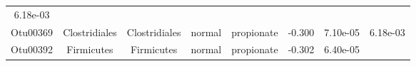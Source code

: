 \documentclass[11pt,]{article}
\begin{document}
\begin{longtable}[]{@{}cccccccc@{}}
\begin{minipage}[t]{0.08\columnwidth}
6.18e-03\strut
\end{minipage}\tabularnewline
\begin{minipage}[t]{0.08\columnwidth}\centering\strut
Otu00369\strut
\end{minipage} & \begin{minipage}[t]{0.15\columnwidth}\centering\strut
Clostridiales\strut
\end{minipage} & \begin{minipage}[t]{0.15\columnwidth}\centering\strut
Clostridiales\strut
\end{minipage} & \begin{minipage}[t]{0.08\columnwidth}\centering\strut
normal\strut
\end{minipage} & \begin{minipage}[t]{0.09\columnwidth}\centering\strut
propionate\strut
\end{minipage} & \begin{minipage}[t]{0.07\columnwidth}\centering\strut
-0.300\strut
\end{minipage} & \begin{minipage}[t]{0.08\columnwidth}\centering\strut
7.10e-05\strut
\end{minipage} & \begin{minipage}[t]{0.08\columnwidth}\centering\strut
6.18e-03\strut
\end{minipage}\tabularnewline
\begin{minipage}[t]{0.08\columnwidth}\centering\strut
Otu00392\strut
\end{minipage} & \begin{minipage}[t]{0.15\columnwidth}\centering\strut
Firmicutes\strut
\end{minipage} & \begin{minipage}[t]{0.15\columnwidth}\centering\strut
Firmicutes\strut
\end{minipage} & \begin{minipage}[t]{0.08\columnwidth}\centering\strut
normal\strut
\end{minipage} & \begin{minipage}[t]{0.09\columnwidth}\centering\strut
propionate\strut
\end{minipage} & \begin{minipage}[t]{0.07\columnwidth}\centering\strut
-0.302\strut
\end{minipage} & \begin{minipage}[t]{0.08\columnwidth}\centering\strut
6.40e-05\strut
\end{minipage} & \begin{minipage}[t]{0.08\columnwidth}\centering\strut

\end{minipage}
\end{longtable}
\end{document}
